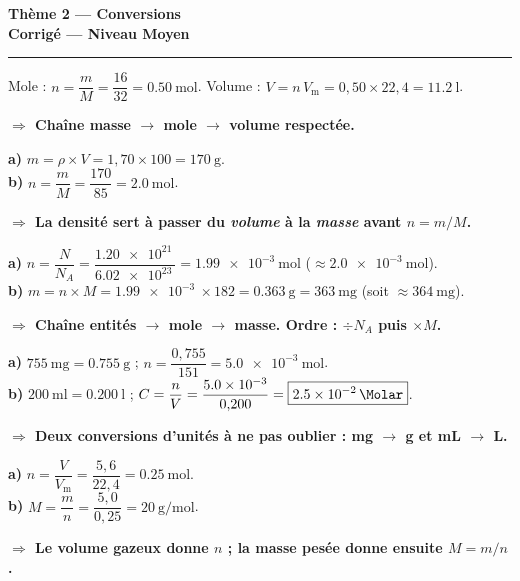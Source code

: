 \documentclass[11pt,a4paper]{article}
\newcommand{\Vm}{V_{\mathrm m}}
\newcommand{\rep}[1]{\par\smallskip\noindent\textbf{\color{corrcol}$\Rightarrow$ #1}}
\begin{document}
\begin{center}
{\LARGE\bfseries\color{primarydark}Thème 2 — Conversions}\\[1pt]
{\large\color{corrcol}\textbf{Corrigé — Niveau Moyen}}\\
{\color{primary}\rule{0.6\linewidth}{1pt}}
\end{center}

\begin{cor}
Mole : $n=\dfrac{m}{M}=\dfrac{16}{32}=\SI{0,50}{\mole}$.\quad
Volume : $V=n\,\Vm = 0{,}50\times22{,}4 = \boxed{\SI{11,2}{\litre}}$.
\rep{Chaîne masse $\to$ mole $\to$ volume respectée.}
\end{cor}

\begin{cor}
\textbf{a)} $m=\rho\times V = 1{,}70\times100 = \SI{170}{\gram}$.\\
\textbf{b)} $n=\dfrac{m}{M}=\dfrac{170}{85}=\boxed{\SI{2,0}{\mole}}$.
\rep{La densité sert à passer du \emph{volume} à la \emph{masse} avant $n=m/M$.}
\end{cor}

\begin{cor}
\textbf{a)} $n=\dfrac{N}{N_A}=\dfrac{\SI{1,20e21}{}}{\SI{6,02e23}{}}=\SI{1,99e-3}{\mole}$
($\approx\SI{2,0e-3}{\mole}$).\\
\textbf{b)} $m=n\times M = \SI{1,99e-3}{}\times182 = \SI{0,363}{\gram} = \boxed{\SI{363}{\milli\gram}}$
(soit $\approx\SI{364}{\milli\gram}$).
\rep{Chaîne entités $\to$ mole $\to$ masse. Ordre : $\div N_A$ puis $\times M$.}
\end{cor}

\begin{cor}
\textbf{a)} $\SI{755}{\milli\gram}=\SI{0,755}{\gram}$ ; $n=\dfrac{0{,}755}{151}=\SI{5,0e-3}{\mole}$.\\
\textbf{b)} $\SI{200}{\milli\litre}=\SI{0,200}{\litre}$ ;
$C=\dfrac{n}{V}=\dfrac{\SI{5,0e-3}{}}{0{,}200}=\boxed{\SI{2,5e-2}{\Molar}}$.
\rep{Deux conversions d'unités à ne pas oublier : mg $\to$ g et mL $\to$ L.}
\end{cor}

\begin{cor}
\textbf{a)} $n=\dfrac{V}{\Vm}=\dfrac{5{,}6}{22{,}4}=\SI{0,25}{\mole}$.\\
\textbf{b)} $M=\dfrac{m}{n}=\dfrac{5{,}0}{0{,}25}=\boxed{\SI{20}{\gram\per\mole}}$.
\rep{Le volume gazeux donne $n$ ; la masse pesée donne ensuite $M=m/n$.}
\end{cor}
\end{document}
